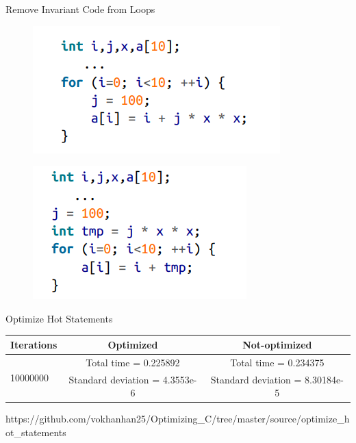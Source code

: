 \documentclass[aspectratio=169,xcolor=dvipsnames]{beamer}
\begin{document}
\begin{frame}{Remove Invariant Code from Loops}
    \begin{figure}
        \centering
        \includegraphics[scale = 0.9]{invarient_code_1.png}
        \label{fig:my_label}
    \end{figure}
    \begin{figure}
        \centering
        \includegraphics[scale = 0.9]{invarient_code_2.png}
        \label{fig:my_label}
    \end{figure}
\end{frame}

\begin{frame}{Optimize Hot Statements}
\begin{center}
        \begin{tabular}{|c|c|c|}
        \hline
            Iterations & Optimized & Not-optimized \\    
        \hline
            \multicolumn{1}{|l|}{\multirow{2}{*}{10000000}} & Total time = 0.225892 & Total time = 0.234375\\
            \multicolumn{1}{|l|}{} & Standard deviation = 4.3553e-6 & Standard deviation = 8.30184e-5\\
            \hline
        \end{tabular}
    \end{center}
    \small \flushright 
    https://github.com/vokhanhan25/Optimizing\_C/tree/master/source/optimize\_hot\_statements
\end{frame}
\end{document}

